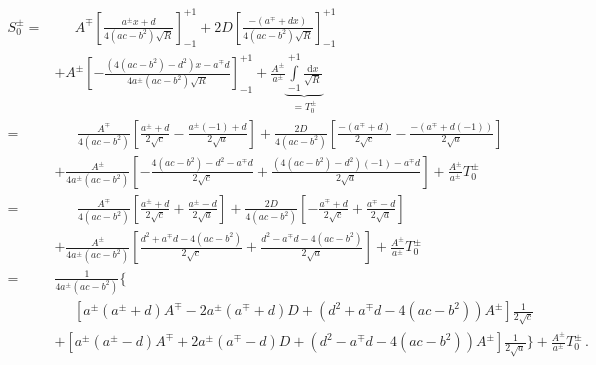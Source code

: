 \begin{align}
   S^{\pm}_0 %
  =& \phantom{+}~ A^{\mp} \left[ \frac{  a^{\pm}x + d   }{4\left(ac-b^2\right)\sqrt{R}} \right]_{-1}^{+1}
              +     2 D       \left[ \frac{-(a^{\mp}  + d x)}{4\left(ac-b^2\right)\sqrt{R}} \right]_{-1}^{+1} \nonumber \\
  ~& +                A^{\pm} \left[ -\frac{\left(4\left(ac-b^2\right)-d^2\right)x-a^{\mp}d}{4 a^{\pm}\left(ac-b^2\right)\sqrt{R}} \right]_{-1}^{+1}
              + \frac{A^{\pm}}{a^{\pm}} \underbrace{\int\limits_{-1}^{+1} \frac{\mathrm{d}x}{\sqrt{R}}}_{=T^{\pm}_0} \nonumber \\
  =& \phantom{+}~\,   \frac{A^{\mp}}{4\left(ac-b^2\right)} \left[
                      \frac{a^{\pm}     + d}{2\sqrt{c}}
                    - \frac{a^{\pm}(-1) + d}{2\sqrt{a}} \right] %
  +                 \frac{2 D}{4\left(ac-b^2\right)} \left[
                      \frac{-(a^{\mp} + d     )}{2\sqrt{c}}
                    - \frac{-(a^{\mp} + d (-1))}{2\sqrt{a}} \right] \nonumber \\
  ~&+           \frac{A^{\pm}}{4 a^{\pm}\left(ac-b^2\right)} \left[ - \frac{      4\left(ac-b^2\right)-d^2            -a^{\mp}d}{2\sqrt{c}}
                                                         + \frac{\left(4\left(ac-b^2\right)-d^2\right)(-1) -a^{\mp}d}{2\sqrt{a}} \right] %
    +         \frac{A^{\pm}}{a^{\pm}} T^{\pm}_0 \nonumber \\
  =& \phantom{+}~\,  \frac{A^{\mp}}{4\left(ac-b^2\right)} \left[
       \frac{a^{\pm} + d}{2\sqrt{c}}
     + \frac{a^{\pm} - d}{2\sqrt{a}} \right]
  +    \frac{2 D}{4\left(ac-b^2\right)} \left[
     - \frac{a^{\mp} + d}{2\sqrt{c}}
     + \frac{a^{\mp} - d}{2\sqrt{a}} \right] \nonumber \\
  ~& +   \frac{A^{\pm}}{4 a^{\pm}\left(ac-b^2\right)} \left[   \frac{ d^2 + a^{\mp}d -4\left(ac-b^2\right) }{2\sqrt{c}}
                                                           + \frac{ d^2 - a^{\mp}d -4\left(ac-b^2\right) }{2\sqrt{a}} \right]
     + \frac{A^{\pm}}{a^{\pm}} T^{\pm}_0 \nonumber \\
  =& \frac{1}{4 a^{\pm}\left(ac-b^2\right)} \Biggl\{ \nonumber \\
  ~& \phantom{+}\,
     \left[
           a^{\pm} \left( a^{\pm} + d               \right) A^{\mp}
       - 2 a^{\pm} \left( a^{\mp} + d               \right) D
       +           \left( d^2 + a^{\mp}d -4\left(ac-b^2\right) \right) A^{\pm}
     \right] \frac{1}{2\sqrt{c}} \nonumber \\
  ~& +
     \left[
           a^{\pm} \left( a^{\pm} - d               \right) A^{\mp}
       + 2 a^{\pm} \left( a^{\mp} - d               \right) D
       +           \left( d^2 - a^{\mp}d -4\left(ac-b^2\right) \right) A^{\pm}
     \right] \frac{1}{2\sqrt{a}}
     \Biggr\} %
   + \frac{A^{\pm}}{a^{\pm}} T^{\pm}_0 \, . \label{eqn:S0_almost}
\end{align}
